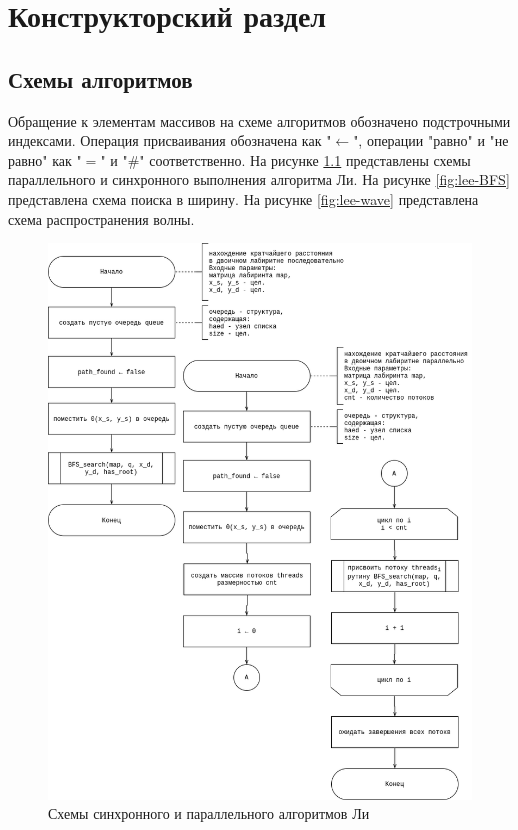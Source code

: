 \chapter{Конструкторский раздел}\label{sec:design}

\section{Схемы алгоритмов}\label{sec:design-flowcharts}

Обращение к элементам массивов на схеме алгоритмов обозначено подстрочными индексами.
Операция присваивания обозначена как "$\leftarrow$", операции "равно" и "не равно" как "$=$" и "$\#$" соответственно.
На рисунке \ref{fig:lee-conc-parall} представлены схемы параллельного и синхронного выполнения алгоритма Ли.
На рисунке \ref{fig:lee-BFS} представлена схема поиска в ширину.
На рисунке \ref{fig:lee-wave} представлена схема распространения волны.
\begin{center}
	\begin{figure}[H]
		\centering
		\includegraphics[width=0.9\linewidth]{assets/lee-concur-parall.drawio.png}
		\caption{Схемы синхронного и параллельного алгоритмов Ли}
		\label{fig:lee-conc-parall}
	\end{figure}
\end{center}
	
